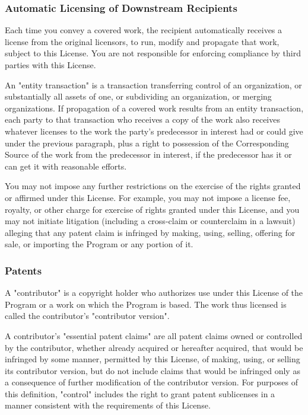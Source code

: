 \documentclass{ctexart}
\begin{document}
\subsubsection{Automatic Licensing of Downstream Recipients}

  Each time you convey a covered work, the recipient automatically
receives a license from the original licensors, to run, modify and
propagate that work, subject to this License.  You are not responsible
for enforcing compliance by third parties with this License.

  An "entity transaction" is a transaction transferring control of an
organization, or substantially all assets of one, or subdividing an
organization, or merging organizations.  If propagation of a covered
work results from an entity transaction, each party to that
transaction who receives a copy of the work also receives whatever
licenses to the work the party's predecessor in interest had or could
give under the previous paragraph, plus a right to possession of the
Corresponding Source of the work from the predecessor in interest, if
the predecessor has it or can get it with reasonable efforts.

  You may not impose any further restrictions on the exercise of the
rights granted or affirmed under this License.  For example, you may
not impose a license fee, royalty, or other charge for exercise of
rights granted under this License, and you may not initiate litigation
(including a cross-claim or counterclaim in a lawsuit) alleging that
any patent claim is infringed by making, using, selling, offering for
sale, or importing the Program or any portion of it.

\subsubsection{Patents}

  A "contributor" is a copyright holder who authorizes use under this
License of the Program or a work on which the Program is based.  The
work thus licensed is called the contributor's "contributor version".

  A contributor's "essential patent claims" are all patent claims
owned or controlled by the contributor, whether already acquired or
hereafter acquired, that would be infringed by some manner, permitted
by this License, of making, using, or selling its contributor version,
but do not include claims that would be infringed only as a
consequence of further modification of the contributor version.  For
purposes of this definition, "control" includes the right to grant
patent sublicenses in a manner consistent with the requirements of
this License.
\end{document}
